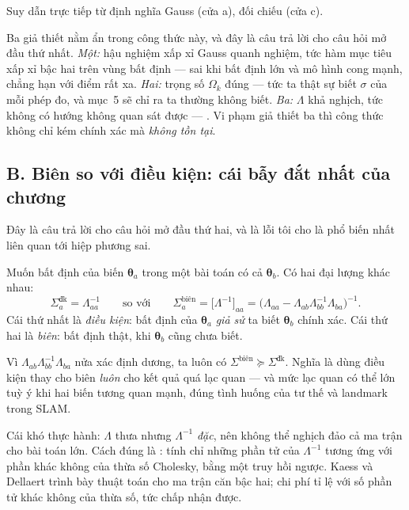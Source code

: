 \documentclass[../../vslam.tex]{subfiles}
\begin{document}
Suy dẫn trực tiếp từ định nghĩa Gauss (cửa a), đối chiếu \cite[§4]{barfoot2017} (cửa c).

Ba giả thiết nằm ẩn trong công thức này, và đây là câu trả lời cho câu hỏi mở đầu thứ nhất. \emph{Một:} hậu nghiệm xấp xỉ Gauss quanh nghiệm, tức hàm mục tiêu xấp xỉ bậc hai trên vùng bất định --- sai khi bất định lớn và mô hình cong mạnh, chẳng hạn với điểm rất xa. \emph{Hai:} trọng số \(\Omega_k\) đúng --- tức ta thật sự biết \(\sigma\) của mỗi phép đo, và mục~5 sẽ chỉ ra ta thường không biết. \emph{Ba:} \(\Lambda\) khả nghịch, tức không có hướng không quan sát được --- . Vi phạm giả thiết ba thì công thức không chỉ kém chính xác mà \emph{không tồn tại}.

\subsection{B. Biên so với điều kiện: cái bẫy đắt nhất của chương}

Đây là câu trả lời cho câu hỏi mở đầu thứ hai, và là lỗi tôi cho là phổ biến nhất liên quan tới hiệp phương sai.

Muốn bất định của biến \(\boldsymbol{\theta}_a\) trong một bài toán có cả \(\boldsymbol{\theta}_b\). Có hai đại lượng khác nhau:
\[
\Sigma_a^{\text{đk}} = \Lambda_{aa}^{-1}
\qquad\text{so với}\qquad
\Sigma_a^{\text{biên}} = \bigl[\Lambda^{-1}\bigr]_{aa}
= \bigl(\Lambda_{aa} - \Lambda_{ab}\Lambda_{bb}^{-1}\Lambda_{ba}\bigr)^{-1}.
\]
Cái thứ nhất là \emph{điều kiện}: bất định của \(\boldsymbol{\theta}_a\) \emph{giả sử} ta biết \(\boldsymbol{\theta}_b\) chính xác. Cái thứ hai là \emph{biên}: bất định thật, khi \(\boldsymbol{\theta}_b\) cũng chưa biết.

Vì \(\Lambda_{ab}\Lambda_{bb}^{-1}\Lambda_{ba}\) nửa xác định dương, ta luôn có \(\Sigma^{\text{biên}} \succeq \Sigma^{\text{đk}}\). Nghĩa là dùng điều kiện thay cho biên \emph{luôn} cho kết quả quá lạc quan --- và mức lạc quan có thể lớn tuỳ ý khi hai biến tương quan mạnh, đúng tình huống của tư thế và landmark trong SLAM.

Cái khó thực hành: \(\Lambda\) thưa nhưng \(\Lambda^{-1}\) \emph{đặc}, nên không thể nghịch đảo cả ma trận cho bài toán lớn. Cách đúng là : tính chỉ những phần tử của \(\Lambda^{-1}\) tương ứng với phần khác không của thừa số Cholesky, bằng một truy hồi ngược. Kaess và Dellaert \cite{kaess2009covariance} trình bày thuật toán cho ma trận căn bậc hai; chi phí tỉ lệ với số phần tử khác không của thừa số, tức chấp nhận được.
\end{document}
